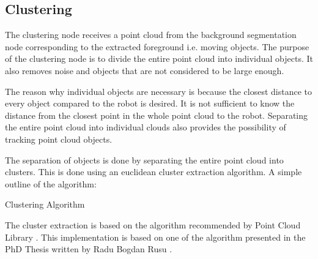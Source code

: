 
\subsection{Clustering}
The clustering node receives a point cloud from the background segmentation node corresponding to the extracted foreground i.e. moving objects. The purpose of the clustering node is to divide the entire point cloud into individual objects. It also removes noise and objects that are not considered to be large enough.  

The reason why individual objects are necessary is because the closest distance to every object compared to the robot is desired. It is not sufficient to know the distance from the closest point in the whole point cloud to the robot. Separating the entire point cloud into individual clouds also provides the possibility of tracking point cloud objects. 


The separation of objects is done by separating the entire point cloud into clusters. This is done using an euclidean cluster extraction algorithm. A simple outline of the algorithm:


\begin{algorithm}[H]
 \SetAlgoLined %
 \caption{Clustering Algorithm}
\end{algorithm}
 
The cluster extraction is based on the algorithm recommended by Point Cloud Library \cite{CE}. This implementation is based on one of the algorithm presented in the PhD Thesis written by Radu Bogdan Rusu \cite{clusterPhD}.
